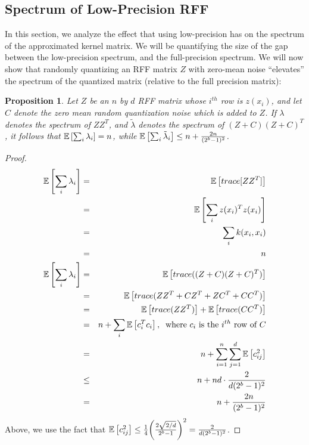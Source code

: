 \documentclass[12pt]{article}
\newcommand{\tlambda}{\tilde{\lambda}}
\newtheorem{proposition}[theorem]{Proposition}
\begin{document}
\subsection{Spectrum of Low-Precision RFF}
\label{sec:spectrum}
In this section, we analyze the effect that using low-precision has on the spectrum of the approximated kernel matrix.  We will be quantifying the size of the gap between the low-precision spectrum, and the full-precision spectrum.  We will now show that randomly quantizing an RFF matrix $Z$ with zero-mean noise ``elevates'' the spectrum of the quantized matrix (relative to the full precision matrix):
\begin{proposition}
	Let $Z$ be an $n$ by $d$ RFF matrix whose $i^{th}$ row is $z(x_i)$, and let $C$ denote the zero mean random quantization noise which is added to $Z$.  If $\lambda$ denotes the spectrum of $ZZ^T$, and $\tlambda$ denotes the spectrum of $(Z+C)(Z+C)^T$, it follows that $\expect{}{\sum_i \lambda_i} = n$, while $\expect{}{\sum_i \tlambda_i} \leq n + \frac{2n}{(2^b-1)^2}$.
\end{proposition}
\begin{proof}
	\begin{eqnarray*}
		\expect{}{\sum_i \lambda_i} &=& \expect{}{trace[ZZ^T]} \\
		&=& \expect{}{\sum_i z(x_i)^Tz(x_i)}\\
		&=& \sum_i k(x_i,x_i)\\
		&=& n \\
		\expect{}{\sum_i \lambda_i} &=& \expect{}{trace((Z+C)(Z+C)^T)} \\
		&=& 	\expect{}{trace(ZZ^T+CZ^T + ZC^T + CC^T)}  \\
		&=& \expect{}{trace(ZZ^T)} + \expect{}{trace(CC^T)} \\
		&=& n + \sum_i \expect{}{c_i^T c_i}, \;\;\text{where $c_i$ is the $i^{th}$ row of $C$}\\
		&=& n + \sum_{i=1}^n \sum_{j=1}^d \expect{}{c_{ij}^2} \\
		&\leq& n + nd\cdot \frac{2}{d(2^b-1)^2}\\
		&=& n + \frac{2n}{(2^b-1)^2}
	\end{eqnarray*}
	Above, we use the fact that $\expect{}{c_{ij}^2} \leq \frac{1}{4}\bigg(\frac{2\sqrt{2/d}}{2^b-1}\bigg)^2 = \frac{2}{d(2^b-1)^2}$.
\end{proof}
\end{document}
